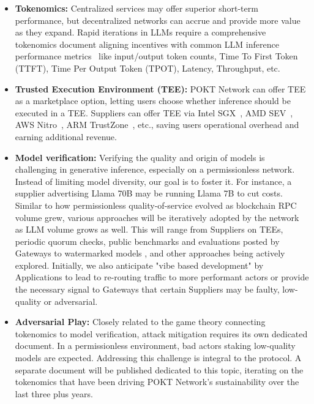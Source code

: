 \documentclass[conference,compsoc]{IEEEtran}
\begin{document}
\begin{itemize}
    \item \textbf{Tokenomics:} Centralized services may offer superior short-term performance, but decentralized networks can accrue and provide more value as they expand. Rapid iterations in LLMs require a comprehensive tokenomics document aligning incentives with common LLM inference performance metrics~\cite{databricksInferencePerformance} like input/output token counts, Time To First Token (TTFT), Time Per Output Token (TPOT), Latency, Throughput, etc.

    \item \textbf{Trusted Execution Environment (TEE):} POKT Network can offer TEE as a marketplace option, letting users choose whether inference should be executed in a TEE. Suppliers can offer TEE via Intel SGX~\cite{intelIntelSoftware}, AMD SEV~\cite{amdsev}, AWS Nitro~\cite{amazonLightweightHypervisor}, ARM TrustZone~\cite{armTrustZoneCortexA}, etc., saving users operational overhead and earning additional revenue.

    \item \textbf{Model verification:} Verifying the quality and origin of models is challenging in generative inference, especially on a permissionless network. Instead of limiting model diversity, our goal is to foster it. For instance, a supplier advertising Llama 70B may be running Llama 7B to cut costs. Similar to how permissionless quality-of-service evolved as blockchain RPC volume grew, various approaches will be iteratively adopted by the network as LLM volume grows as well. This will range from Suppliers on TEEs, periodic quorum checks, public benchmarks and evaluations posted by Gateways to watermarked models \cite{watermarking}, and other approaches being actively explored. Initially, we also anticipate "vibe based development" by Applications \cite{simonWillisonVibes} to lead to re-routing traffic to more performant actors or provide the necessary signal to Gateways that certain Suppliers may be faulty, low-quality or adversarial.
    \item \textbf{Adversarial Play:} Closely related to the game theory connecting tokenomics to model verification, attack mitigation requires its own dedicated document. In a permissionless environment, bad actors staking low-quality models are expected. Addressing this challenge is integral to the protocol. A separate document will be published dedicated to this topic, iterating on the tokenomics that have been driving POKT Network's sustainability over the last three plus years.


\end{itemize}
\end{document}
